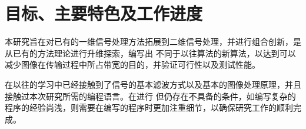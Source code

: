 %
%
%
%

\section{目标、主要特色及工作进度}

本研究旨在对已有的一维信号处理方法拓展到二维信号处理，并进行组合创新，是从已有的方法理论进行升维探索，编写出
不同于以往算法的新算法，以达到可以减少图像在传输过程中所占带宽的目的，并验证可行性以及测试性能。

在以往的学习中已经接触到了信号的基本滤波方式以及基本的图像处理原理，并且接触过本次研究所需的编程语言。在进行
但仍存在不具备的条件，如编写复杂的程序的经验尚浅，则需要在编写的程序时更加注重细节，以确保研究工作的顺利完成。
